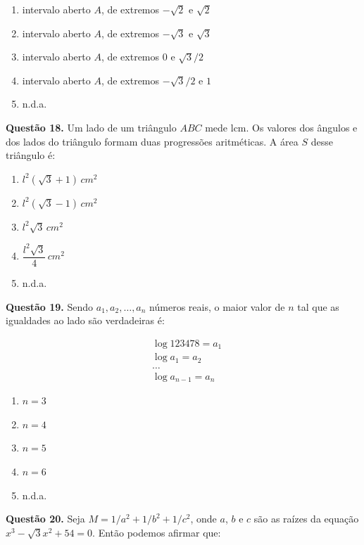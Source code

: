 \documentclass[11pt]{article}
\begin{document}
\begin{enumerate}[\bf A (\quad)]
    \item intervalo aberto $A$, de extremos $-\sqrt{2}$ e $\sqrt{2}$
    \item intervalo aberto $A$, de extremos $-\sqrt{3}$ e $\sqrt{3}$
    \item intervalo aberto $A$, de extremos $0$ e $\sqrt{3}/2$
    \item intervalo aberto $A$, de extremos $-\sqrt{3}/2$ e $1$
    \item n.d.a.
\end{enumerate}

\textbf{Questão 18.} Um  lado  de  um  triângulo  $ABC$  mede  lcm.  Os  valores dos ângulos e dos lados do triângulo formam duas progressões aritméticas. A área $S$ desse triângulo é:


\begin{enumerate}[\bf A (\quad)]
    \item $l^2(\sqrt{3} + 1) \, cm^2$
    \item $l^2(\sqrt{3} - 1) \, cm^2$
    \item $l^2\sqrt{3} \, cm^2$
    \item $\dfrac{l^2\sqrt{3}}{4} \, cm^2$
    \item n.d.a.
\end{enumerate}

\textbf{Questão 19.} Sendo $a_1,  a_2, \dots, a_n$ números reais, o maior valor de $n$ tal que as igualdades ao lado são verdadeiras é:

\begin{align*}
&\log 123478 = a_1 \\
&\log a_1 = a_2 \\
&\dots \\
&\log a_{n-1} = a_n
\end{align*}

\begin{multicols}{5}
    \begin{enumerate}[\bf A (\quad)]
        \item $n = 3$
        \item $n = 4$
        \item $n = 5$
        \item $n = 6$
        \item n.d.a.
    \end{enumerate}
\end{multicols}

\textbf{Questão 20.} Seja $M = 1 / a^2 + 1 / b^2 + 1 / c^2$,  onde  $a$,  $b$  e  $c$  são  as  raízes  da  equação  $x^3 - \sqrt{3}x^2 + 54 =0$.  Então  podemos  afirmar que:
\end{document}
